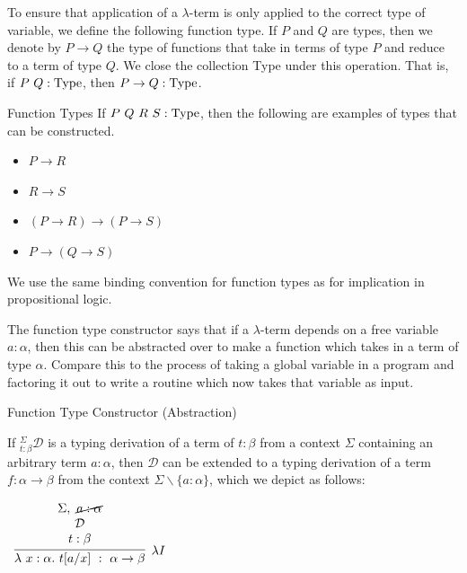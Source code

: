 \documentclass{book}
\begin{document}
        To ensure that application of a $\lambda$-term is only applied to the correct type of variable, we define the following function type. If $P$ and $Q$ are types, then we denote by $P \to Q$ the type of functions that take in terms of type $P$ and reduce to a term of type $Q$. We close the collection Type under this operation. That is, if $P \ Q : \text{Type}$, then $P \to Q : \text{Type}$.

        \begin{eg}{Function Types}
            If $P \ Q \ R \ S : \type$, then the following are examples of types that can be constructed. 

                \begin{itemize}
                    \item[] $P \to R$
                    \item[] $R \to S$ 
                    \item[] $(P \to R) \to (P \to S)$
                    \item[] $P \to (Q \to S)$
                \end{itemize}
            
            We use the same binding convention for function types as for implication in propositional logic. 
        \end{eg}

        The function type constructor says that if a $\lambda$-term depends on a free variable $a : \alpha$, then this can be abstracted over to make a function which takes in a term of type $\alpha$. Compare this to the process of taking a global variable in a program and factoring it out to write a routine which now takes that variable as input. 

        {Function Type Constructor (Abstraction)}
    
            If $^{\Sigma}_{t : \beta}\mathcal{D}$ is a typing derivation of a term of  $t : \beta$ from a context $\Sigma$ containing an arbitrary term $a : \alpha$, then $\mathcal{D}$ can be extended to a typing derivation of a term $f : \alpha \rightarrow \beta$ from the context $\Sigma \backslash \{a : \alpha\}$, which we depict as follows: 
    
            \begin{center}
                $\begin{array}{c}		
                    \infer[\lambda I]{\lambda \ x : \alpha. \ t[a/x] \ : \ \alpha \rightarrow \beta}
                        {\begin{array}{c} \Sigma, \ \cancel{a : \alpha} \\ \mathcal{D} \\ t : \beta \end{array}}
                \end{array}$
            \end{center}
\end{document}
